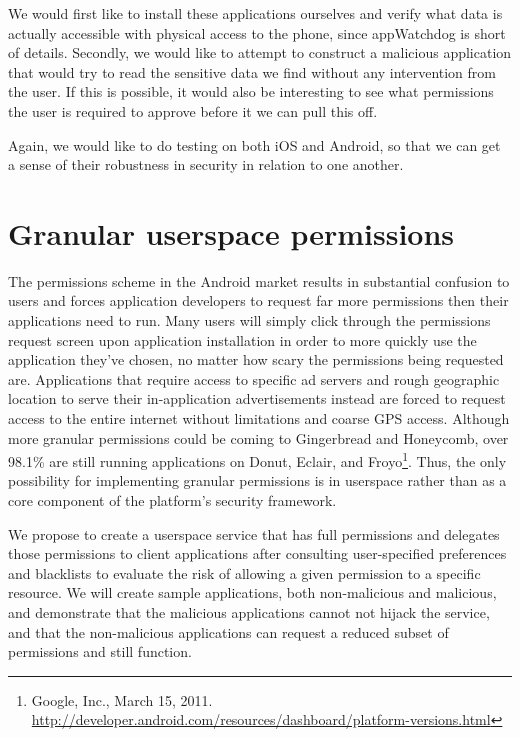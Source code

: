 \documentclass[11pt]{article}
\begin{document}
We would first like to install these applications ourselves and verify what
data is actually accessible with physical access to the phone, since
appWatchdog is short of details. Secondly, we would like to attempt to
construct a malicious application that would try to read the sensitive data we
find without any intervention from the user. If this is possible, it would also
be interesting to see what permissions the user is required to approve before
it we can pull this off.

Again, we would like to do testing on both iOS and Android, so that we can get
a sense of their robustness in security in relation to one another.

\section{Granular userspace permissions}
The permissions scheme in the Android market results in substantial confusion
to users and forces application developers to request far more permissions
then their applications need to run. Many users will simply click through the
permissions request screen upon application installation in order to more
quickly use the application they've chosen, no matter how scary the
permissions being requested are. Applications that require access to specific
ad servers and rough geographic location to serve their in-application
advertisements instead are forced to request access to the entire internet
without limitations and coarse GPS access. Although more granular permissions
could be coming to Gingerbread and Honeycomb, over 98.1\% are still running
applications on Donut, Eclair, and Froyo\footnote{Google, Inc., March 15, 2011.
\url{http://developer.android.com/resources/dashboard/platform-versions.html}}.
Thus, the only possibility for implementing granular permissions is in
userspace rather than as a core component of the platform's security framework.

We propose to create a userspace service that has full permissions and
delegates those permissions to client applications after consulting
user-specified preferences and blacklists to evaluate the risk of allowing a
given permission to a specific resource. We will create sample applications,
both non-malicious and malicious, and demonstrate that the malicious
applications cannot not hijack the service, and that the non-malicious
applications can request a reduced subset of permissions and still function.
\end{document}
